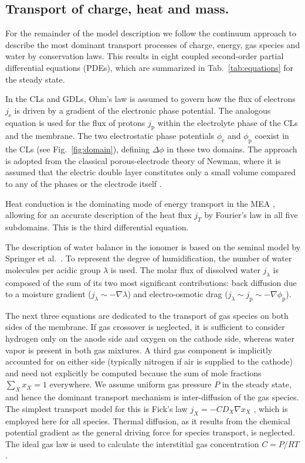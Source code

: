 \documentclass[fontsize=9pt,DIV=calc,a4paper,twocolumn]{scrartcl}
\begin{document}
\subsection*{Transport of charge, heat and mass.}

For the remainder of the model description we follow the continuum approach to describe the most dominant transport processes of charge, energy, gas species and water by conservation laws. This results in eight coupled second-order partial differential equations (PDEs), which are summarized in Tab.~\ref{tab:equations} for the steady state.

In the CLs and GDLs, Ohm's law is assumed to govern how the flux of electrons $j_\mathrm{e}$ is driven by a gradient of the electronic phase potential. The analogous equation is used for the flux of protons $j_\mathrm{p}$ within the electrolyte phase of the CLs and the membrane. The two electrostatic phase potentials $\phi_\mathrm{e}$ and $\phi_\mathrm{p}$ coexist in the CLs (see Fig.~\ref{fig:domain}), defining $\Delta\phi$ in these two domains. The approach is adopted from the classical porous-electrode theory of Newman, where it is assumed that the electric double layer constitutes only a small volume compared to any of the phases or the electrode itself \cite{newman:75}.

Heat conduction is the dominating mode of energy transport in the MEA \cite{bhaiya:14}, allowing for an accurate description of the heat flux $j_T$ by Fourier's law in all five subdomains. This is the third differential equation.

The description of water balance in the ionomer is based on the seminal model by Springer et al.~\cite{springer:91}. To represent the degree of humidification, the number of water molecules per acidic group $\lambda$ is used. The molar flux of dissolved water $j_\lambda$ is composed of the sum of its two most significant contributions: back diffusion due to a moisture gradient ($j_\lambda\sim-\nabla\lambda$) and electro-osmotic drag ($j_\lambda\sim j_\mathrm{p}\sim-\nabla\phi_\mathrm{p}$).

The next three equations are dedicated to the transport of gas species on both sides of the membrane. If gas crossover is neglected, it is sufficient to consider hydrogen only on the anode side and oxygen on the cathode side, whereas water vapor is present in both gas mixtures. A third gas component is implicitly accounted for on either side (typically nitrogen if air is supplied to the cathode) and need not explicitly be computed because the sum of mole fractions $\sum_Xx_X=1$ everywhere. We assume uniform gas pressure $P$ in the steady state, and hence the dominant transport mechanism is inter-diffusion of the gas species. The simplest transport model for this is Fick's law $j_X=-CD_X\nabla x_X$ \cite{bird:02}, which is employed here for all species. Thermal diffusion, as it results from the chemical potential gradient as the general driving force for species transport, is neglected. The ideal gas law is used to calculate the interstitial gas concentration $C=P/RT$.
\end{document}
